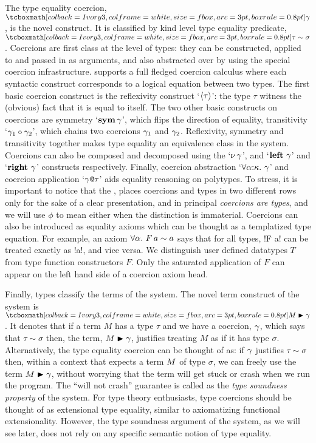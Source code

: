 \documentclass[screen,nonacm,manuscript,review]{acmart} %
\begin{document}
The type equality coercion, $\shl{\Co}$, is the novel construct.
It is classified by kind level type equality predicate,
$\shl{\tau\sim\sigma}$. Coercions are first class at the level of types:
they can be constructed, applied to and passed in as arguments, and also
abstracted over by using the special coercion infrastructure.
\SFC supports a full fledged coercion calculus where
each syntactic construct corresponds to a logical equation between two
types. The first basic coercion construct is the
reflexivity construct `$\langle{\tau}\rangle$': the type $\tau$
witness the (obvious) fact that it is equal to itself. The two other
basic constructs on coercions are symmetry `$\textbf{sym}\,{\gamma}$', which flips
the direction of equality, transitivity `${\gamma_1} \circ {\gamma_2}$',
which chains two coercions $\gamma_1$ and $\gamma_2$. Reflexivity, symmetry
and transitivity together makes type equality an equivalence class in the
system. Coercions can also be composed and decomposed using the
`$\nu\,\gamma$', and `$\textbf{left}~\gamma$' and `$\textbf{right}~\gamma$' constructs
respectively. Finally, coercion abstraction `$\forall\alpha{:}\kappa.~\gamma$' and coercion application `$\gamma\texttt{@}\tau$' aids
equality reasoning on polytypes. To stress, it is important to notice
that the , places coercions and types in two
different rows only for the sake of a clear presentation, and in
principal \emph{coercions are types}, and we will use $\phi$ to mean
either when the distinction is immaterial. Coercions can also
be introduced as equality axioms which can be thought as a templatized type
equation. For example, an axiom $\forall\alpha.~F\, a \sim a$
says that for all types, !F a! can be treated exactly as !a!, and vice
versa. We distinguish user defined datatypes $T$ from type function constructors
$F$. Only the saturated application of $F$ can appear on the left hand
side of a coercion axiom head.

Finally, types classify the terms of the system.
The novel term construct of the system is $\shl{\Cast \Tm \Co}$.
It denotes that if a term $M$ has a type $\tau$
and we have a coercion, $\gamma$, which says that $\tau\sim\sigma$
then, the term, $M\mathrel{\blacktriangleright}\gamma$, justifies treating $M$ as if it has type
$\sigma$. Alternatively, the type equality coercion can be thought of
as: if $\gamma$ justifies $\tau \sim \sigma$ then, within a context that
expects a term $M$ of type $\sigma$, we can freely use the term $M\mathrel{\blacktriangleright}\gamma$,
without worrying that the term will get stuck or crash when we run the
program. The ``will not crash'' guarantee is called as the \emph{type
  soundness property} of the system.
For type theory enthusiasts, type coercions should be
thought of as extensional type equality, similar to axiomatizing functional
extensionality. However, the type soundness argument of the system, as we
will see later, does not rely on any specific
semantic notion of type equality.
\end{document}
